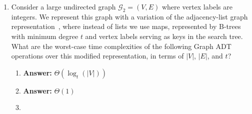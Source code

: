 \documentclass[dvipsnames]{article}
\begin{document}
\begin{enumerate}
\begin{enumerate}
    \item What is the maximum possible number of distinct topological sortings for the vertices of a graph with $8$ vertices and $12$ edges? Briefly justify your answer (1--2 sentences).

    \color{blue}
    \textbf{Answer:} \textbf{1440}\\
    In order to get the maximum number of topological sorting options, we need as many vertices in the graph as possible from which we can start (hereinafter referred to as independent vertices):\\
1) if we take 8 independent vertices, then we will not be able to apply 12 sides.\\
2) if we take 7 independent vertices and one in which everything converges, then we will have 7 sides. If you start adding sides so that there are 12, then the number of independent vertices will already decrease.\\
3) if we take 6 independent vertices, then we will have exactly 6 converging on each side in the remaining 2. It will be 2!*6! = 1440. Into 6 different permutations with two permutations of dependent vertices.\\
There is no point in looking further since the number of independent vertices is only decreasing
    \color{black}

  \end{enumerate}

  \item
  Consider a large undirected graph $\mathcal{G}_2 = (V, E)$ where vertex labels are integers.
  We represent this graph with a variation of the adjacency-list graph representation~\cite[\S 14.2.2]{Goodrich2014},
  where instead of lists we use maps, represented by B-trees~\cite[\S 18]{Cormen2022} with minimum degree $t$ and vertex labels serving
  as keys in the search tree. What are the worst-case time complexities of the following Graph ADT operations
  over this modified representation, in terms of $|V|$, $|E|$, and $t$?
  \begin{enumerate}
    \item {}

    \color{blue}
    \textbf{Answer:} $\Theta(\log_t(|V|))$
    \color{black}

    \item {}

    \color{blue}
    \textbf{Answer:} $\Theta(1)$
    \color{black}

    \item {}


\end{enumerate}
\end{enumerate}
\end{document}
